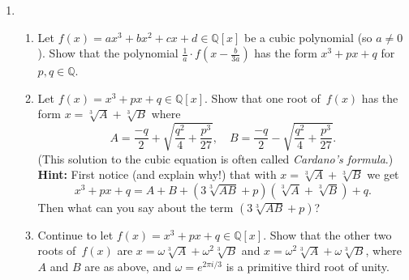 \documentclass[11pt]{article}
\begin{document}
\begin{enumerate}
\item \begin{enumerate}
\item Let $f(x) = ax^3+bx^2+cx+d \in \mathbb{Q}[x]$ be a cubic polynomial (so $a \neq 0$). Show that the polynomial $\frac{1}{a} \cdot f(x-\frac{b}{3a})$ has the form $x^3+px+q$ for $p,q\in \mathbb{Q}$.
\item Let $f(x) = x^3+px+q\in \mathbb{Q}[x]$. Show that one root of~$f(x)$ has the form $x=\sqrt[3]{A}+\sqrt[3]{B}$ where 
\[ A = \frac{-q}{2} + \sqrt{\frac{q^2}{4}+\frac{p^3}{27}}, \quad B = \frac{-q}{2} - \sqrt{\frac{q^2}{4}+\frac{p^3}{27}}.\]
(This solution to the cubic equation is often called \emph{Cardano's formula}.) \\
{\bf Hint:} First notice (and explain why!) that with $x=\sqrt[3]{A}+\sqrt[3]{B}$ we get 
\[ x^3+px+q = A+B+(3\sqrt[3]{AB}+p)(\sqrt[3]{A}+\sqrt[3]{B})+q.\]
Then what can you say about the term $(3\sqrt[3]{AB}+p)$?
\item Continue to let $f(x) = x^3+px+q\in \mathbb{Q}[x]$. Show that the other two roots of~$f(x)$ are $x=\omega\sqrt[3]{A}+\omega^2\sqrt[3]{B}$ and $x=\omega^2\sqrt[3]{A}+\omega\sqrt[3]{B}$, where $A$ and $B$ are as above, and $\omega=e^{2\pi i/3}$ is a primitive third root of unity.
\end{enumerate}

\end{enumerate}
\end{document}
